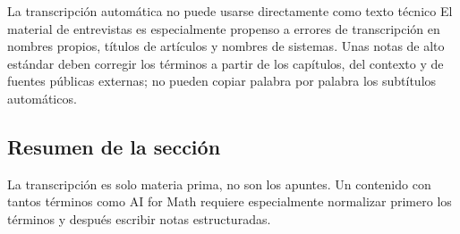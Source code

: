\begin{warningbox}{La transcripción automática no puede usarse directamente como texto técnico}
El material de entrevistas es especialmente propenso a errores de transcripción en nombres propios, títulos de artículos y nombres de sistemas. Unas notas de alto estándar deben corregir los términos a partir de los capítulos, del contexto y de fuentes públicas externas; no pueden copiar palabra por palabra los subtítulos automáticos.
\end{warningbox}

\subsection{Resumen de la sección}

La transcripción es solo materia prima, no son los apuntes. Un contenido con tantos términos como AI for Math requiere especialmente normalizar primero los términos y después escribir notas estructuradas.
